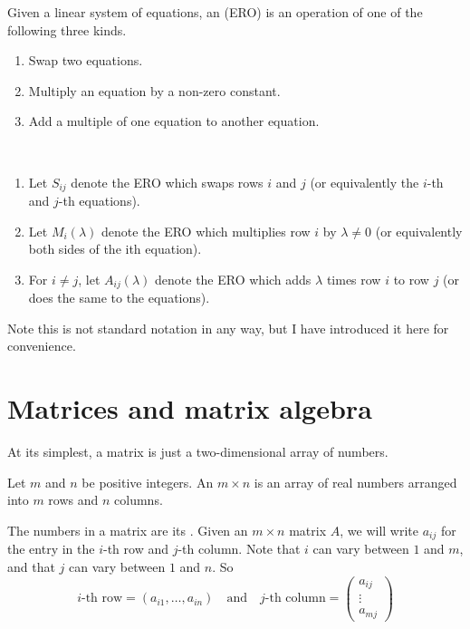 \begin{definition}
Given a linear system of equations, an  (ERO) is an operation of one of the following three kinds.
\begin{enumerate}[label=(\alph*)]
\item Swap two equations.
\item Multiply an equation by a non-zero constant.
\item Add a multiple of one equation to another equation.
\end{enumerate}
\end{definition}

\begin{notation} \
\begin{enumerate}[label=(\alph*)]
\item Let $S_{ij}$ denote the ERO which swaps rows $i$ and $j$ (or equivalently the $i$-th and $j$-th equations).
\item Let $M_i(\lambda)$ denote the ERO which multiplies row $i$ by $\lambda\neq0$ (or equivalently both sides of the ith equation).
\item For $i\neq j$, let $A_{ij}(\lambda)$ denote the ERO which adds $\lambda$ times row $i$ to row $j$ (or does the same to the equations).
\end{enumerate}
Note this is not standard notation in any way, but I have introduced it here for
convenience.
\end{notation}

\section{Matrices and matrix algebra}
At its simplest, a matrix is just a two-dimensional array of numbers.

\begin{definition}
Let $m$ and $n$ be positive integers. An $m\times n$  is an array of real numbers arranged into $m$ rows and $n$ columns.
\end{definition}

The numbers in a matrix are its . Given an $m\times n$ matrix $A$, we will write $a_{ij}$ for the entry in the $i$-th row and $j$-th column. Note that $i$ can vary between $1$ and $m$, and that $j$ can vary between $1$ and $n$. So
\[ i\text{-th row}=(a_{i1},\dots,a_{in}) \quad \text{and} \quad j\text{-th column}=\begin{pmatrix}a_{ij}\\\vdots\\a_{mj}\end{pmatrix} \]


